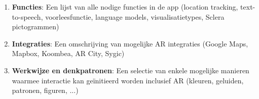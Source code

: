 \begin{enumerate}
    \item \textbf{Functies}: Een lijst van alle nodige functies in de app (location tracking, text-to-speech, voorleesfunctie, language models, visualisatietypes, Sclera pictogrammen)
    \item \textbf{Integraties}: Een omschrijving van mogelijke AR integraties (Google Maps, Mapbox, Koombea, AR City, Sygic)
    \item \textbf{Werkwijze en denkpatronen}: Een selectie van enkele mogelijke manieren waarmee interactie kan geïnitieerd worden inclusief AR (kleuren, geluiden, patronen, figuren, ...)
\end{enumerate}
